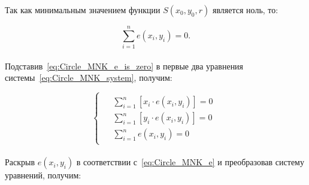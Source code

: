 Так как минимальным значением функции $S(x_0, y_0, r)$ является ноль, то:

\begin{equation}
    \label{eq:Circle_MNK_e_is_zero}
    \sum_{i=1}^{n} e(x_i, y_i) = 0.
\end{equation} \\

Подставив~\ref{eq:Circle_MNK_e_is_zero} в первые два уравнения системы~\ref{eq:Circle_MNK_system}, получим:

\begin{equation*}
    \begin{cases}
        \begin{aligned}
            &\sum_{i=1}^{n} \left[ x_i \cdot e(x_i, y_i) \right] = 0 \\
            &\sum_{i=1}^{n} \left[ y_i \cdot e(x_i, y_i) \right] = 0 \\
            &\sum_{i=1}^{n} e(x_i, y_i) = 0
        \end{aligned}
    \end{cases}
\end{equation*} \\

Раскрыв $e(x_i, y_i)$ в соответствии с~\ref{eq:Circle_MNK_e} и преобразовав систему уравнений, получим:

